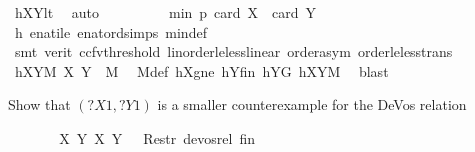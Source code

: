 \begin{isabellebody}
\ hXYlt\ \isamarkupfalse%
\ auto\isanewline
\ \ \ \ \isamarkupfalse%
\ \isamarkupfalse%
\ {\isachardoublequoteopen}{\isachardot}{\kern0pt}{\isachardot}{\kern0pt}{\isachardot}{\kern0pt}\ {\isasymle}\ min\ p\ {\isacharparenleft}{\kern0pt}card\ {\isacharquery}{\kern0pt}X{}\ {\isacharplus}{\kern0pt}\ card\ {\isacharquery}{\kern0pt}Y{}\ {\isacharminus}{\kern0pt}\ {}{\isacharparenright}{\kern0pt}{\isachardoublequoteclose}\ \isamarkupfalse%
\ h\ enat{\isacharunderscore}{\kern0pt}ile\ enat{\isacharunderscore}{\kern0pt}ord{\isacharunderscore}{\kern0pt}simps{\isacharparenleft}{\kern0pt}{}{\isacharparenright}{\kern0pt}\ min{\isacharunderscore}{\kern0pt}def\isanewline
\ \ \ \ \ \ \isamarkupfalse%
\ {\isacharparenleft}{\kern0pt}smt\ {\isacharparenleft}{\kern0pt}verit{\isacharcomma}{\kern0pt}\ ccfv{\isacharunderscore}{\kern0pt}threshold{\isacharparenright}{\kern0pt}\ linorder{\isacharunderscore}{\kern0pt}le{\isacharunderscore}{\kern0pt}less{\isacharunderscore}{\kern0pt}linear\ order{\isachardot}{\kern0pt}asym\ order{\isacharunderscore}{\kern0pt}le{\isacharunderscore}{\kern0pt}less{\isacharunderscore}{\kern0pt}trans{\isacharparenright}{\kern0pt}\isanewline
\ \ \ \ \isamarkupfalse%
\ \isamarkupfalse%
\ hXY{}M{\isacharcolon}{\kern0pt}\ {\isachardoublequoteopen}{\isacharparenleft}{\kern0pt}{\isacharquery}{\kern0pt}X{}{\isacharcomma}{\kern0pt}\ {\isacharquery}{\kern0pt}Y{}{\isacharparenright}{\kern0pt}\ {\isasymin}\ M{\isachardoublequoteclose}\ \isamarkupfalse%
\ M{\isacharunderscore}{\kern0pt}def\ hXgne\ hY{}fin\ hY{}G\ hXYM\ \isamarkupfalse%
\ blast%
\begin{isamarkuptext}%
Show that $(?X1, ?Y1)$ is a smaller counterexample for the DeVos relation%
\end{isamarkuptext}\isamarkuptrue%
\ \ \ \ \isamarkupfalse%
\ \isamarkupfalse%
\ {\isachardoublequoteopen}{\isacharparenleft}{\kern0pt}{\isacharparenleft}{\kern0pt}{\isacharquery}{\kern0pt}X{}{\isacharcomma}{\kern0pt}\ {\isacharquery}{\kern0pt}Y{}{\isacharparenright}{\kern0pt}{\isacharcomma}{\kern0pt}\ {\isacharparenleft}{\kern0pt}X{\isacharcomma}{\kern0pt}\ Y{\isacharparenright}{\kern0pt}{\isacharparenright}{\kern0pt}\ {\isasymin}\ \ Restr\ devos{\isacharunderscore}{\kern0pt}rel\ {\isacharquery}{\kern0pt}fin{\isachardoublequoteclose}\ \isamarkupfalse%

\end{isabellebody}
